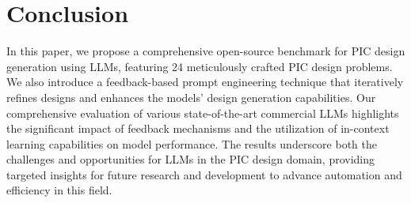 \section{Conclusion}
\label{sec:conclu}
In this paper, we propose a comprehensive open-source benchmark for PIC design generation using LLMs, featuring 24 meticulously crafted PIC design problems. 
We also introduce a feedback-based prompt engineering technique that iteratively refines designs and enhances the models' design generation capabilities.
Our comprehensive evaluation of various state-of-the-art commercial LLMs highlights the significant impact of feedback mechanisms and the utilization of in-context learning capabilities on model performance. 
The results underscore both the challenges and opportunities for LLMs in the PIC design domain, providing targeted insights for future research and development to advance automation and efficiency in this field.

